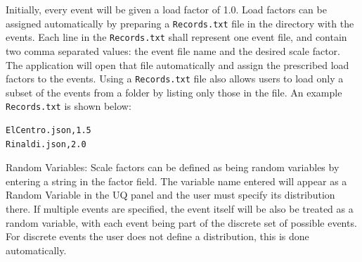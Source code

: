 Initially, every
event will be given a load factor of 1.0. Load factors can be assigned automatically by preparing a \texttt{Records.txt} file in the directory with the events. Each line in the \texttt{Records.txt} shall represent one event file, and contain two comma separated values: the event file name and the desired scale factor. The application will open that file automatically and assign the prescribed load factors to the events. Using a \texttt{Records.txt} file also allows users to load only a subset of the events from a folder by listing only those in the file. An example \texttt{Records.txt} is shown below:

\begin{verbatim}
ElCentro.json,1.5
Rinaldi.json,2.0
\end{verbatim}

Random Variables: Scale factors can be defined as being random variables by entering a string in the factor field. The variable name entered will appear as a Random Variable in the UQ panel and the user must specify its distribution there. If multiple
events are specified, the event itself will be also be treated as a random
variable, with each event being part of the discrete set of possible
events. For discrete events the user does not define a distribution, this is done automatically.
